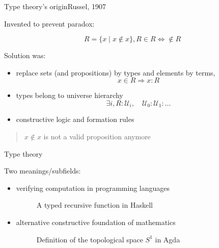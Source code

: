 \documentclass[english]{beamer}
\begin{document}
\begin{frame}{Type theory's origin}{Russel, 1907}

Invented to prevent paradox:


    \[ R = \{x \mid x \not \in x \}, R\in R \Leftrightarrow \not \in R \]
    

Solution was:
\begin{itemize}
\item replace sets (and propositions) by types and elements by terms, $$x \in R \Rightarrow x : R$$
\item types belong to universe hierarchy 
        \[\exists i, R : \mathcal{U}_i, \quad \mathcal{U}_0 : \mathcal{U}_1 : \ldots \]
\item constructive logic and formation rules
\end{itemize}

\begin{quotation}
$x \not \in x$ is not a valid proposition anymore
\end{quotation}

\end{frame}


\begin{frame}{Type theory}
    
    Two meanings/subfields:
    \begin{itemize}
        \item verifying computation in programming languages
        \begin{figure}
            
            \caption{A typed recursive function in Haskell}
        \end{figure}
    
        \pause{}
        \item alternative constructive foundation of mathematics
        \begin{figure}
            
            \caption{Definition of the topological space \(S^1\) in Agda}
        \end{figure}
    
    \end{itemize}

    
\end{frame}
\end{document}
